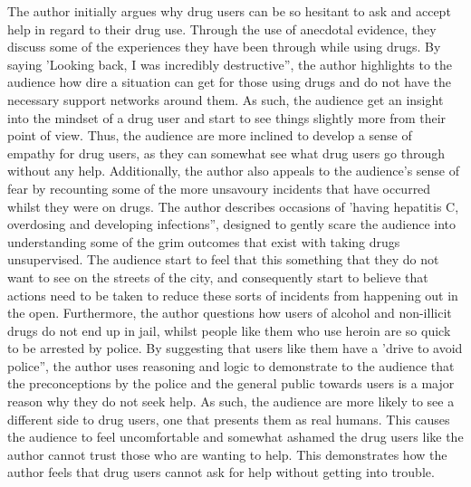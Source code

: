 \documentclass[a4paper]{article}
\begin{document}
The author initially argues why drug users can be so hesitant to ask and accept help in regard to their drug use. Through the use of anecdotal evidence, they discuss some of the experiences they have been through while using drugs. By saying 'Looking back, I was incredibly destructive”, the author highlights to the audience how dire a situation can get for those using drugs and do not have the necessary support networks around them. As such, the audience get an insight into the mindset of a drug user and start to see things slightly more from their point of view. Thus, the audience are more inclined to develop a sense of empathy for drug users, as they can somewhat see what drug users go through without any help. Additionally, the author also appeals to the audience’s sense of fear by recounting some of the more unsavoury incidents that have occurred whilst they were on drugs. The author describes occasions of 'having hepatitis C, overdosing and developing infections”, designed to gently scare the audience into understanding some of the grim outcomes that exist with taking drugs unsupervised. The audience start to feel that this something that they do not want to see on the streets of the city, and consequently start to believe that actions need to be taken to reduce these sorts of incidents from happening out in the open. Furthermore, the author questions how users of alcohol and non-illicit drugs do not end up in jail, whilst people like them who use heroin are so quick to be arrested by police. By suggesting that users like them have a 'drive to avoid police”, the author uses reasoning and logic to demonstrate to the audience that the preconceptions by the police and the general public towards users is a major reason why they do not seek help. As such, the audience are more likely to see a different side to drug users, one that presents them as real humans. This causes the audience to feel uncomfortable and somewhat ashamed the drug users like the author cannot trust those who are wanting to help. This demonstrates how the author feels that drug users cannot ask for help without getting into trouble.\\
\end{document}
